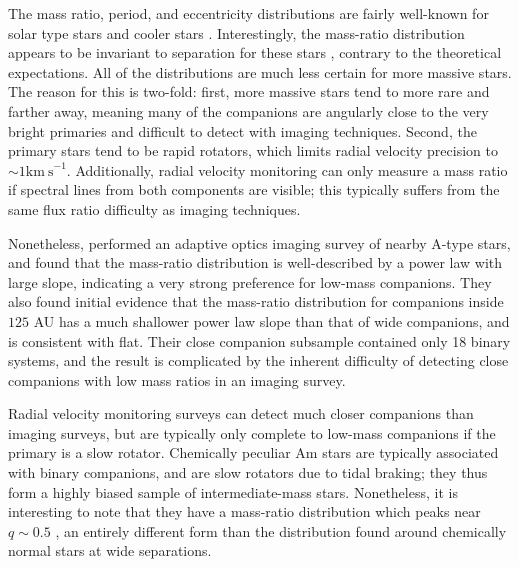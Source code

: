 The mass ratio, period, and eccentricity distributions are fairly well-known for solar type stars \citep{Duquennoy1991, Raghavan2010} and cooler stars \citep{Fischer1992, Delfosse2004}. Interestingly, the mass-ratio distribution appears to be invariant to separation for these stars \citep{Meyer2013}, contrary to the theoretical expectations. All of the distributions are much less certain for more massive stars. The reason for this is two-fold: first, more massive stars tend to more rare and farther away, meaning many of the companions are angularly close to the very bright primaries and difficult to detect with imaging techniques. Second, the primary stars tend to be rapid rotators, which limits radial velocity precision to $\sim 1 \mathrm{km\ s}^{-1}$. Additionally, radial velocity monitoring can only measure a mass ratio if spectral lines from both components are visible; this typically suffers from the same flux ratio difficulty as imaging techniques. 

Nonetheless, \citet{DeRosa2014} performed an adaptive optics imaging survey of nearby A-type stars, and found that the mass-ratio distribution is well-described by a power law with large slope, indicating a very strong preference for low-mass companions. They also found initial evidence that the mass-ratio distribution for companions inside $125$ AU has a much shallower power law slope than that of wide companions, and is consistent with flat. Their close companion subsample contained only 18 binary systems, and the result is complicated by the inherent difficulty of detecting close companions with low mass ratios in an imaging survey. 

Radial velocity monitoring surveys can detect much closer companions than imaging surveys, but are typically only complete to low-mass companions if the primary is a slow rotator. Chemically peculiar Am stars are typically associated with binary companions, and are slow rotators due to tidal braking; they thus form a highly biased sample of intermediate-mass stars. Nonetheless, it is interesting to note that they have a mass-ratio distribution which peaks near $q \sim 0.5$ \citep{Vuissoz2004}, an entirely different form than the distribution found around chemically normal stars at wide separations.


